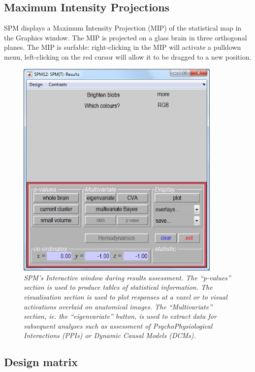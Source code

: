 \subsection{Maximum Intensity Projections}

SPM displays a Maximum Intensity Projection (MIP) of the statistical map in the Graphics window. The MIP is projected on a glass brain in three orthogonal planes. The MIP is surfable: right-clicking in the MIP will activate a pulldown menu, left-clicking  on the red cursor will allow it to be dragged to a new position.

\begin{figure}
\begin{center}
\includegraphics[width=100mm]{auditory/interactive}
\caption{\em SPM's Interactive window during results assessment. The ``\textit{p}-values'' section is used to produce tables of statistical information. The visualisation section is used to plot responses at a voxel or to visual activations overlaid on anatomical images. The ``Multivariate'' section, ie. the ``eigenvariate'' button, is used to extract data for subsequent analyses such as assessment of PsychoPhysiological Interactions (PPIs) or Dynamic  Causal Models (DCMs).}
\end{center}
\end{figure}

\subsection{Design matrix}

